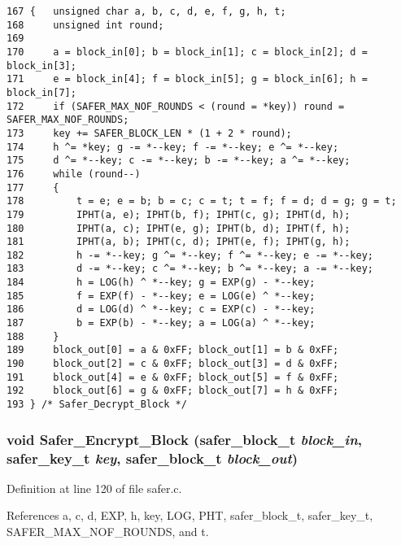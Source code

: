 \footnotesize\begin{verbatim}167 {   unsigned char a, b, c, d, e, f, g, h, t;
168     unsigned int round;
169 
170     a = block_in[0]; b = block_in[1]; c = block_in[2]; d = block_in[3];
171     e = block_in[4]; f = block_in[5]; g = block_in[6]; h = block_in[7];
172     if (SAFER_MAX_NOF_ROUNDS < (round = *key)) round = SAFER_MAX_NOF_ROUNDS;
173     key += SAFER_BLOCK_LEN * (1 + 2 * round);
174     h ^= *key; g -= *--key; f -= *--key; e ^= *--key;
175     d ^= *--key; c -= *--key; b -= *--key; a ^= *--key;
176     while (round--)
177     {
178         t = e; e = b; b = c; c = t; t = f; f = d; d = g; g = t;
179         IPHT(a, e); IPHT(b, f); IPHT(c, g); IPHT(d, h);
180         IPHT(a, c); IPHT(e, g); IPHT(b, d); IPHT(f, h);
181         IPHT(a, b); IPHT(c, d); IPHT(e, f); IPHT(g, h);
182         h -= *--key; g ^= *--key; f ^= *--key; e -= *--key;
183         d -= *--key; c ^= *--key; b ^= *--key; a -= *--key;
184         h = LOG(h) ^ *--key; g = EXP(g) - *--key;
185         f = EXP(f) - *--key; e = LOG(e) ^ *--key;
186         d = LOG(d) ^ *--key; c = EXP(c) - *--key;
187         b = EXP(b) - *--key; a = LOG(a) ^ *--key;
188     }
189     block_out[0] = a & 0xFF; block_out[1] = b & 0xFF;
190     block_out[2] = c & 0xFF; block_out[3] = d & 0xFF;
191     block_out[4] = e & 0xFF; block_out[5] = f & 0xFF;
192     block_out[6] = g & 0xFF; block_out[7] = h & 0xFF;
193 } /* Safer_Decrypt_Block */
\end{verbatim}\normalsize 
{}
\subsubsection{\setlength{\rightskip}{0pt plus 5cm}void Safer\_\-Encrypt\_\-Block ({\bf safer\_\-block\_\-t} {\em block\_\-in}, {\bf safer\_\-key\_\-t} {\em key}, {\bf safer\_\-block\_\-t} {\em block\_\-out})}\label{safer_8h_a11}




Definition at line 120 of file safer.c.

References a, c, d, EXP, h, key, LOG, PHT, safer\_\-block\_\-t, safer\_\-key\_\-t, SAFER\_\-MAX\_\-NOF\_\-ROUNDS, and t.



